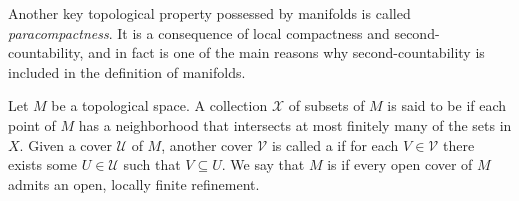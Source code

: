 \documentclass[12pt, ThmSectionNumbering]{CrispyNotes}
\begin{document}
Another key topological property possessed by manifolds is called \emph{paracompactness}. It is a consequence of local compactness and second-countability, and in fact is one of the main reasons why second-countability is included in the definition of manifolds.

Let $M$ be a topological space. A collection $\mathcal{X}$ of subsets of $M$ is said to be  if each point of $M$ has a neighborhood that intersects at most finitely many of the sets in $X$. Given a cover $\mathcal{U}$ of $M$, another cover $\mathcal{V}$ is called a  if for each $V \in \mathcal{V}$ there exists some $U \in \mathcal{U}$ such that $V \subseteq U$. We say that $M$ is  if every open cover of $M$ admits an open, locally finite refinement.
\end{document}

